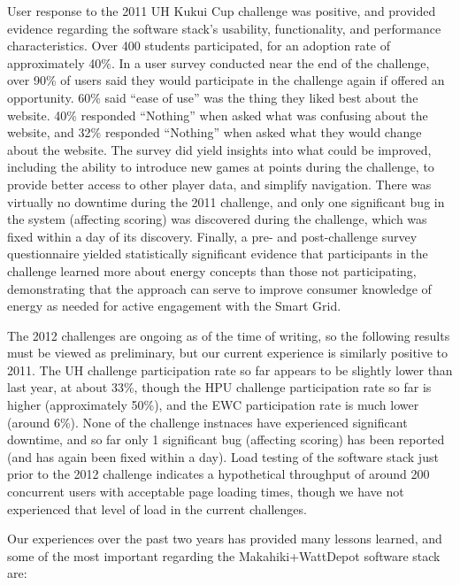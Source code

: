 User response to the 2011 UH Kukui Cup challenge was positive, and provided evidence regarding the software stack's usability, functionality, and performance characteristics.   Over 400 students participated, for an adoption rate of approximately 40\%.  In a user survey conducted near the end of the challenge, over 90\% of users said they would participate in the challenge again if offered an opportunity.  60\%  said ``ease of use'' was the thing they liked best about the website.  40\% responded ``Nothing'' when asked what was confusing about the website, and 32\% responded ``Nothing'' when asked what they would change about the website.  The survey did yield insights into what could be improved, including the ability to introduce new games at points during the challenge, to provide better access to other player data, and simplify navigation.  There was virtually no downtime during the 2011 challenge, and only one significant bug in the system (affecting scoring) was discovered during the challenge, which was fixed within a day of its discovery.  Finally, a pre- and post-challenge survey questionnaire yielded statistically significant evidence that participants in the challenge learned more about energy concepts than those not participating, demonstrating that the approach can serve to improve consumer knowledge of energy as needed for active engagement with the Smart Grid.

The 2012 challenges are ongoing as of the time of writing, so the following results must be viewed as preliminary, but our current experience is similarly positive to 2011.  The UH challenge participation rate so far appears to be slightly lower than last year, at about 33\%, though the HPU challenge participation rate so far is higher (approximately 50\%), and the EWC participation rate is much lower (around 6\%). None of the challenge instnaces have experienced significant downtime, and so far only 1 significant bug (affecting scoring) has been reported (and has again been fixed within a day).  Load testing of the software stack just prior to the 2012 challenge indicates a hypothetical throughput of around 200 concurrent users with acceptable page loading times, though we have not experienced that level of load in the current challenges. 

Our experiences over the past two years has provided many lessons learned, and some of the most important regarding the Makahiki+WattDepot software stack are:

